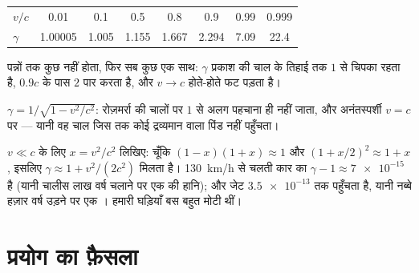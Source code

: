 \begin{example}[गामा, संख्याओं में]\label{ex:g12:special-relativity:gammatable}
\begin{center}\small
\begin{tabular}{lccccccc}
$v/c$    & 0.01     & 0.1   & 0.5   & 0.8   & 0.9   & 0.99 & 0.999\\
$\gamma$ & 1.00005 & 1.005 & 1.155 & 1.667 & 2.294 & 7.09 & 22.4
\end{tabular}
\end{center}
पन्नों तक कुछ नहीं होता, फिर सब कुछ एक साथ: $\gamma$ प्रकाश की चाल के तिहाई तक
$1$ से चिपका रहता है, $0.9c$ के पास $2$ पार करता है, और $v \to c$ होते-होते
फट पड़ता है।
\end{example}

\begin{omfigure}

{\small $\gamma = 1/\sqrt{1 - v^2/c^2}$: रोज़मर्रा की चालों पर $1$ से अलग पहचाना ही नहीं जाता, और
अनंतस्पर्शी $v = c$ पर  --- यानी वह चाल जिस तक कोई द्रव्यमान वाला
पिंड नहीं पहुँचता।}
\end{omfigure}

\begin{remark}\label{rem:g12:special-relativity:everyday}
$v \ll c$ के लिए $x = v^2/c^2$ लिखिए: चूँकि $(1-x)(1+x) \approx 1$ और $(1 + x/2)^2 \approx 1 + x$, इसलिए $\gamma \approx 1 + v^2/(2c^2)$ मिलता है।
\qty{130}{km/h} से चलती कार का $\gamma - 1 \approx \num{7e-15}$ है (यानी चालीस लाख वर्ष चलाने पर एक  की
हानि); और जेट $\num{3.5e-13}$ तक पहुँचता है, यानी नब्बे हज़ार वर्ष उड़ने पर एक ।
हमारी घड़ियाँ बस बहुत मोटी थीं।
\end{remark}

\section{प्रयोग का फ़ैसला}

